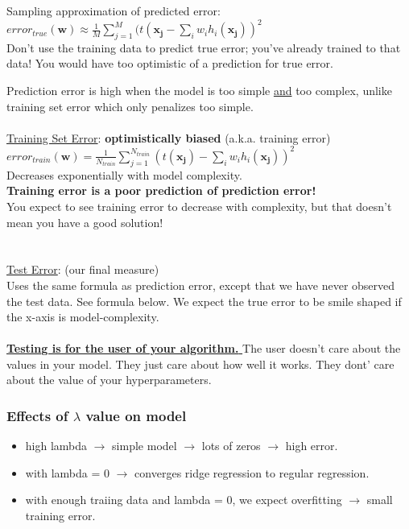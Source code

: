 Sampling approximation of predicted error: \hfill \\
$\displaystyle error_{true}(\bm{w}) \approx \frac{1}{M} \sum_{j=1}^M(t(\bm{x_j} - \sum_i w_i h_i(\bm{x_j}))^2$  \hfill \\
Don't use the training data to predict true error; you've already trained to that data!  You would have too optimistic of a prediction for true error. 

Prediction error is high when the model is too simple \underline{and} too complex, unlike training set error which only penalizes too simple.  \hfill \\
\hfill \\

\underline{Training Set Error}:  \textbf{optimistically biased}  (a.k.a. training error) \hfill \\
$\displaystyle  error_{train}(\bm{w}) = \frac{1}{N_{train}} \sum_{j=1}^{N_{train}}(t(\bm{x_j})-\sum_{i} w_i h_i(\bm{x_j}))^2$ \hfill \\
Decreases exponentially with model complexity.   \hfill \\
\textbf{Training error is a poor prediction of prediction error!} \hfill \\
You expect to see training error to decrease with complexity, but that doesn't mean you have a good solution!  \hfill \\
\hfill \\  \hfill \\


\underline{Test Error}: (our final measure)  \hfill \\
Uses the same formula as prediction error, except that we have never observed the test data.  See formula below. 
We expect the true error to be smile shaped if the x-axis is model-complexity. 
\hfill \\ \hfill \\

\underline{\textbf{Testing is for the user of your algorithm. }}
The user doesn't care about the values in your model.  They just care about how well it works.  
 They dont' care about the value of your hyperparameters. 


\subsubsection{Effects of $\lambda$ value on model}
 \begin{itemize}
 	\item high lambda $\rightarrow$ simple model $\rightarrow$ lots of zeros $\rightarrow$ high error. 
	\item with lambda = 0 $\rightarrow$ converges ridge regression to regular regression. 
	\item with enough traiing data and lambda = 0, we expect overfitting $\rightarrow$ small training error. 
\end{itemize}

